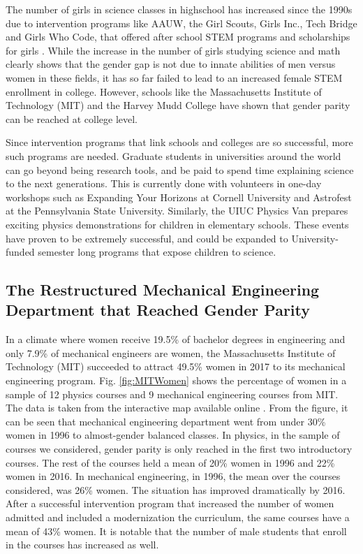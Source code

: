 \documentclass[utf8]{frontiersSCNS} %
\begin{document}
The number of girls in science classes in highschool has increased since the 1990s due to intervention programs like AAUW, the Girl Scouts, Girls Inc., Tech Bridge and Girls Who Code,  that offered after school STEM programs and scholarships for girls \citep{highschoolNumbers}.
 While the increase in the number of girls studying science and math clearly shows that the gender gap is not due to innate abilities of men versus women in these fields, it has so far failed to lead to an increased female STEM enrollment in college. However, schools like the Massachusetts Institute of Technology (MIT) and the Harvey Mudd College have shown that gender parity can be reached at college level.
 
 Since intervention programs that link schools and colleges are so successful, more such programs are needed. Graduate students in universities around the world can go beyond being research tools, and be paid to spend time explaining science to the next generations.  This is currently done with volunteers in one-day workshops such as Expanding Your Horizons at Cornell University and Astrofest at the Pennsylvania State University. Similarly, the UIUC Physics Van prepares exciting physics demonstrations for children in elementary schools. These events have proven to be extremely successful, and could be expanded to University-funded semester long programs that expose children to science.  

\subsection{The Restructured Mechanical Engineering Department that Reached Gender Parity}
In a climate where women receive 19.5\% of bachelor degrees in engineering  and only 7.9\% of mechanical engineers are women, the Massachusetts Institute of Technology (MIT) succeeded to attract 49.5\% women in 2017 to its mechanical engineering program. Fig. \ref{fig:MITWomen} shows the percentage of women in a sample of 12 physics courses and 9 mechanical engineering courses from MIT. The data is taken from the interactive map available online \cite{GenderDiversityMIT}. From the figure, it can be seen that mechanical engineering department went from under 30\% women in 1996 to almost-gender balanced classes.  In physics, in the sample of courses we considered, gender parity is only reached in the first two introductory courses. The rest of the courses held a mean of 20\% women in 1996 and 22\% women in 2016. In mechanical engineering, in 1996, the mean over the courses considered, was 26\% women. The situation has improved dramatically by 2016. After a successful intervention program that increased the number of women admitted and included a modernization the curriculum, the same courses have a mean of 43\% women. It is notable that the number of male students that enroll in the courses has increased as well. %
\end{document}
